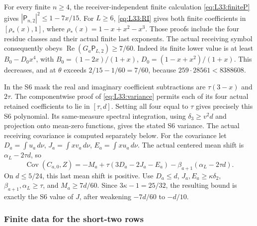 For every finite \(n\ge4\), the receiver-independent finite
calculation \eqref{eq:L33:finiteP} gives
\( |\mathsf P_{n,2}|^2\le1-7x/15\).
For \(L\ge6\), \eqref{eq:L33:RI} gives both finite coefficients
in \([\rho_*(x),1]\), where
\(\rho_*(x)=1-x+x^2-x^3\).
Those proofs include the four residue classes and their actual
finite last exponents.
The actual receiving symbol consequently obeys
\(\operatorname{Re}(G_a\mathsf P_{L,2})\ge7/60\).
Indeed its finite lower value is at least
\(B_0-D_0x^4\), with
\(B_0=(1-2x)/(1+x)\), \(D_0=(1-x+x^2)/(1+x)\).
This decreases, and at \(\theta\) exceeds
\(2/15-1/60=7/60\), because
\(259\cdot28561<8388608\).

In the S6 mask the real and imaginary coefficient subtractions
are \(\tau(3-x)\) and \(2\tau\). The componentwise proof of
\eqref{eq:L33:variance} permits each of its four actual retained
coefficients to lie in \([\tau,d]\). Setting all four equal to
\(\tau\) gives precisely this S6 polynomial. Its same-measure
spectral integration, using \(\delta_3\ge v^2d\) and projection
onto mean-zero functions, gives the stated S6 variance.
The actual receiving covariance is computed separately below.
For the covariance let \(D_a=\int u_a\,d\nu\),
\(J_a=\int xv_a\,d\nu\), \(E_a=\int xu_a\,d\nu\).
The actual centered mean shift is \(\alpha_L-2\tau d\), so
\[
 \operatorname{Cov}(C_{a,0},Z)
 =-M_a+\tau(3D_a-2J_a-E_a)
       -\beta_{a+1}(\alpha_L-2\tau d).
\]
On \(d\le5/24\), this last mean shift is positive. Use
\(D_a\le d\), \(J_a,E_a\ge\kappa\delta_2\),
\(\beta_{a+1},\alpha_L\ge\tau\), and \(M_a\ge7d/60\).
Since \(3\kappa-1=25/32\), the resulting bound is exactly
the S6 value of \(J\), after weakening \(-7d/60\) to \(-d/10\).

\subsubsection{Finite data for the short-two rows}
\label{sec:q117-unified:short-two-data}

